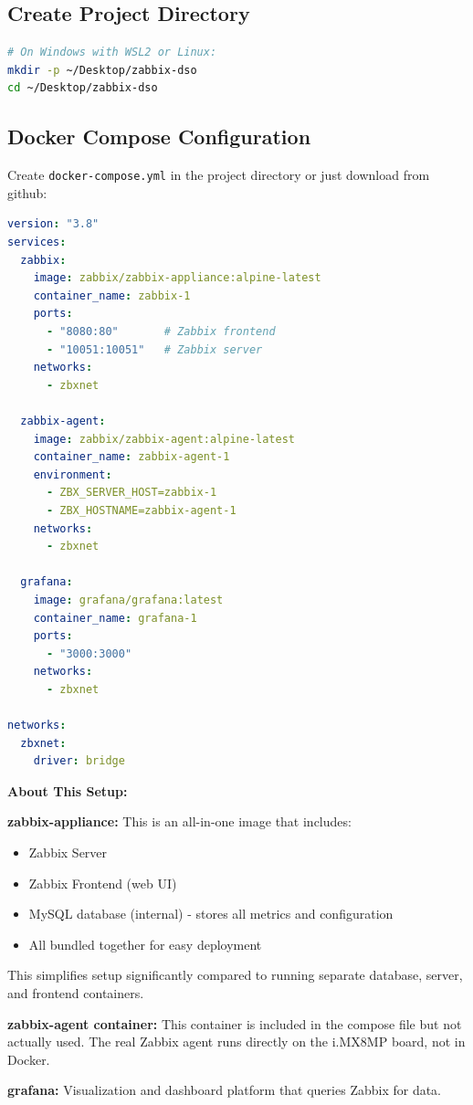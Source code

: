 \documentclass[12pt,a4paper]{report}
\begin{document}
\subsection{Create Project Directory}

\begin{lstlisting}[language=bash]
# On Windows with WSL2 or Linux:
mkdir -p ~/Desktop/zabbix-dso
cd ~/Desktop/zabbix-dso
\end{lstlisting}

\subsection{Docker Compose Configuration}

Create \texttt{docker-compose.yml} in the project directory or just download from github:

\begin{lstlisting}[language=yaml]
version: "3.8"
services:
  zabbix:
    image: zabbix/zabbix-appliance:alpine-latest
    container_name: zabbix-1
    ports:
      - "8080:80"       # Zabbix frontend
      - "10051:10051"   # Zabbix server
    networks:
      - zbxnet
      
  zabbix-agent:
    image: zabbix/zabbix-agent:alpine-latest
    container_name: zabbix-agent-1
    environment:
      - ZBX_SERVER_HOST=zabbix-1
      - ZBX_HOSTNAME=zabbix-agent-1
    networks:
      - zbxnet
      
  grafana:
    image: grafana/grafana:latest
    container_name: grafana-1
    ports:
      - "3000:3000"
    networks:
      - zbxnet
      
networks:
  zbxnet:
    driver: bridge
\end{lstlisting}

\begin{important}
\textbf{About This Setup:}

\textbf{zabbix-appliance:} This is an all-in-one image that includes:
\begin{itemize}
    \item Zabbix Server
    \item Zabbix Frontend (web UI)
    \item MySQL database (internal) - stores all metrics and configuration
    \item All bundled together for easy deployment
\end{itemize}

This simplifies setup significantly compared to running separate database, server, and frontend containers.

\textbf{zabbix-agent container:} This container is included in the compose file but not actually used. The real Zabbix agent runs directly on the i.MX8MP board, not in Docker.

\textbf{grafana:} Visualization and dashboard platform that queries Zabbix for data.
\end{important}
\end{document}
